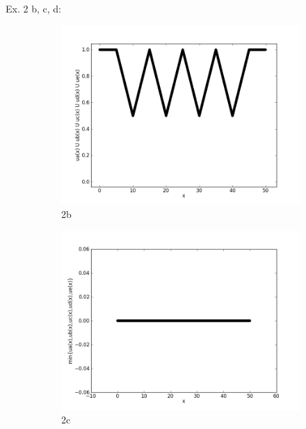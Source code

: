 \documentclass{report}
\begin{document}
\newpage
Ex. 2 b, c, d:

\begin{figure}[ht]
        \begin{subfigure}[b]{0.5\textwidth}
                \centering
                \includegraphics[width=\textwidth]{ex2b.png}
                \caption{2b}
        \end{subfigure}
	\begin{subfigure}[b]{0.5\textwidth}
                \centering
                \includegraphics[width=\textwidth]{ex2c.png}
                \caption{2c}
	\end{subfigure}
	\begin{subfigure}[b]{0.5\textwidth}
                \centering

\end{subfigure}
\end{figure}
\end{document}
